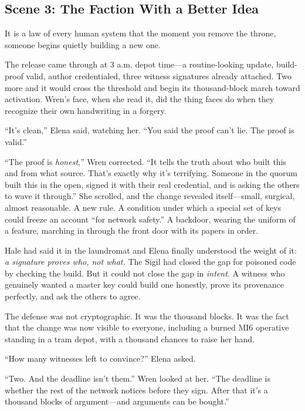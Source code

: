 \documentclass[12pt,letterpaper]{book}
\begin{document}
\hypertarget{scene-3-the-faction-with-a-better-idea}{%
\subsection{Scene 3: The Faction With a Better
Idea}\label{scene-3-the-faction-with-a-better-idea}}

It is a law of every human system that the moment you remove the throne,
someone begins quietly building a new one.

The release came through at 3 a.m. depot time---a routine-looking update,
build-proof valid, author credentialed, three witness signatures already
attached. Two more and it would cross the threshold and begin its thousand-block
march toward activation. Wren's face, when she read it, did the thing faces do
when they recognize their own handwriting in a forgery.

``It's clean,'' Elena said, watching her. ``You said the proof can't lie. The
proof is valid.''

``The proof is \emph{honest},'' Wren corrected. ``It tells the truth about who
built this and from what source. That's exactly why it's terrifying. Someone in
the quorum built this in the open, signed it with their real credential, and is
asking the others to wave it through.'' She scrolled, and the change revealed
itself---small, surgical, almost reasonable. A new rule. A condition under
which a special set of keys could freeze an account ``for network safety.'' A
backdoor, wearing the uniform of a feature, marching in through the front door
with its papers in order.

Hale had said it in the laundromat and Elena finally understood the weight of
it: \emph{a signature proves who, not what.} The Sigil had closed the gap for
poisoned code by checking the build. But it could not close the gap in
\emph{intent}. A witness who genuinely wanted a master key could build one
honestly, prove its provenance perfectly, and ask the others to agree.

The defense was not cryptographic. It was the thousand blocks. It was the fact
that the change was now visible to everyone, including a burned MI6 operative
standing in a tram depot, with a thousand chances to raise her hand.

``How many witnesses left to convince?'' Elena asked.

``Two. And the deadline isn't them.'' Wren looked at her. ``The deadline is
whether the rest of the network notices before they sign. After that it's a
thousand blocks of argument---and arguments can be bought.''
\end{document}
